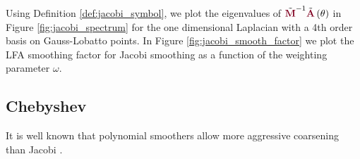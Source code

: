Using Definition \ref{def:jacobi_symbol}, we plot the eigenvalues of $\tilde{{\color{burgundy}\mathbf{M}}}^{-1} \tilde{{\color{burgundy}\mathbf{A}}} \left( \theta \right)$ in Figure \ref{fig:jacobi_spectrum} for the one dimensional Laplacian with a 4th order basis on Gauss-Lobatto points.
In Figure \ref{fig:jacobi_smooth_factor} we plot the LFA smoothing factor for Jacobi smoothing as a function of the weighting parameter $\omega$.

\subsection{Chebyshev}

It is well known that polynomial smoothers allow more aggressive coarsening than Jacobi \cite{brannick2015polynomial}.
